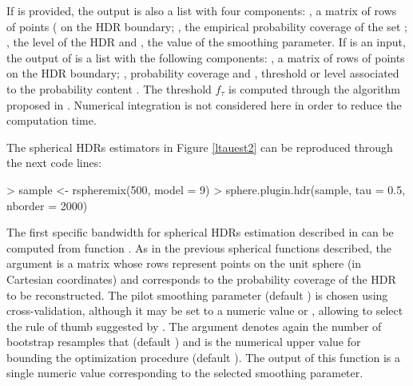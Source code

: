If  is provided, the output is also a list with four components: , a matrix of rows of points ( on the HDR boundary; , the empirical probability coverage of the set ; , the level of the HDR and , the value of the smoothing parameter. If  is an input, the output of  is a list with the following components:
, a matrix of rows of points on the HDR boundary; , probability coverage  and , threshold or level associated to the probability content . The threshold $f_{\tau}$ is computed through the algorithm proposed in \cite{hyndman1996computing}. Numerical integration is not considered here in order to reduce the computation time. 



The spherical HDRs estimators in Figure \ref{ltauest2} can be reproduced through the next code lines: 
\begin{example}
> sample <- rspheremix(500, model = 9)
> sphere.plugin.hdr(sample, tau = 0.5, nborder = 2000)
\end{example} 
 
The first specific bandwidth for spherical HDRs estimation described in \cite{saavedra2020nonparametric} can be computed from function . As in the previous spherical functions described, the argument  is a matrix whose rows represent points on the unit sphere (in Cartesian coordinates) and  corresponds to the probability coverage  of the HDR to be reconstructed. The pilot smoothing parameter  (default ) is chosen using cross-validation, although it may be set to a numeric value or , allowing to select the rule of thumb suggested by \cite{garcia2013exact}. The argument  denotes again the number of bootstrap resamples that (default ) and  is the numerical upper value for bounding the optimization procedure (default ). The output of this function is a single numeric value corresponding to the selected smoothing parameter.


